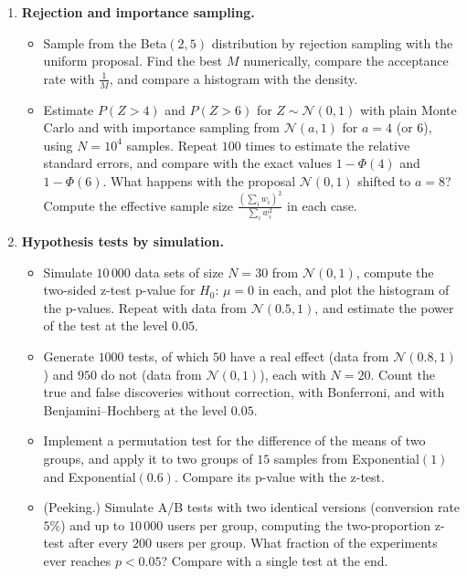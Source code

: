 \documentclass[11pt]{article}
\theoremstyle{definition}
\theoremstyle{plain}
\theoremstyle{remark}
\begin{document}
\begin{enumerate}[label=\textbf{P\arabic*.}, leftmargin=*]
    \item \textbf{Rejection and importance sampling.}
    \begin{itemize}
        \item Sample from the Beta$(2, 5)$ distribution by rejection sampling with the uniform proposal. Find the best $M$ numerically, compare the acceptance rate with $\frac{1}{M}$, and compare a histogram with the density.
        \item Estimate $P(Z > 4)$ and $P(Z > 6)$ for $Z \sim \mathcal{N}(0, 1)$ with plain Monte Carlo and with importance sampling from $\mathcal{N}(a, 1)$ for $a = 4$ (or $6$), using $N = 10^4$ samples. Repeat $100$ times to estimate the relative standard errors, and compare with the exact values $1 - \Phi(4)$ and $1 - \Phi(6)$. What happens with the proposal $\mathcal{N}(0, 1)$ shifted to $a = 8$? Compute the effective sample size $\frac{(\sum_i w_i)^2}{\sum_i w_i^2}$ in each case.
    \end{itemize}

    \item \textbf{Hypothesis tests by simulation.}
    \begin{itemize}
        \item Simulate $10\,000$ data sets of size $N = 30$ from $\mathcal{N}(0, 1)$, compute the two-sided z-test p-value for $H_0$: $\mu = 0$ in each, and plot the histogram of the p-values. Repeat with data from $\mathcal{N}(0.5, 1)$, and estimate the power of the test at the level $0.05$.
        \item Generate $1000$ tests, of which $50$ have a real effect (data from $\mathcal{N}(0.8, 1)$) and $950$ do not (data from $\mathcal{N}(0, 1)$), each with $N = 20$. Count the true and false discoveries without correction, with Bonferroni, and with Benjamini--Hochberg at the level $0.05$.
        \item Implement a permutation test for the difference of the means of two groups, and apply it to two groups of $15$ samples from Exponential$(1)$ and Exponential$(0.6)$. Compare its p-value with the z-test.
        \item (Peeking.) Simulate A/B tests with two identical versions (conversion rate $5\%$) and up to $10\,000$ users per group, computing the two-proportion z-test after every $200$ users per group. What fraction of the experiments ever reaches $p < 0.05$? Compare with a single test at the end.
    \end{itemize}


\end{enumerate}
\end{document}
